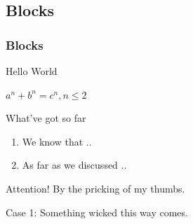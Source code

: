 \documentclass[10pt,aspectratio=169]{beamer}
\begin{document}
\subsection{Blocks}
\begin{frame}[allowframebreaks]
	\frametitle{Blocks}
	
	\begin{definition}[Greetings]
		Hello World
	\end{definition}
	
	\begin{theorem}
		$a^n + b^n = c^n, n \leq 2$
	\end{theorem}
	
	\begin{block}{What've got so far}
		\begin{enumerate}
			\item We know that ..
			\item As far as we discussed ..
		\end{enumerate}
	\end{block}
	
	\begin{alertblock}{Attention!}
		By the pricking of my thumbs.
	\end{alertblock}
	
	\begin{exampleblock}{Case 1:}
		Something wicked this way comes.
	\end{exampleblock}
	
\end{frame}

\closingframe
\end{document}
